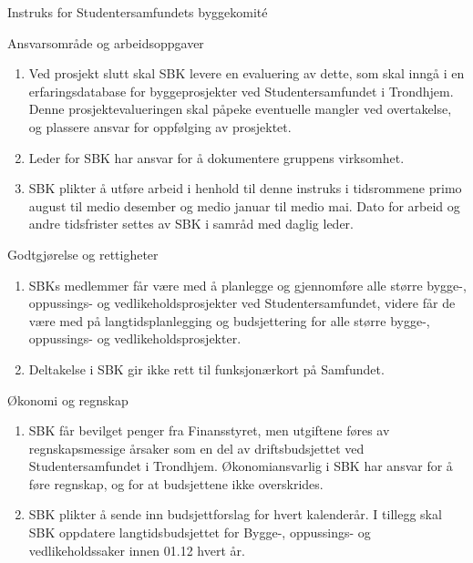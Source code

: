 \begin{instruks}{Instruks for Studentersamfundets byggekomité}{}{}
\begin{instruksledd}{ Ansvarsområde og arbeidsoppgaver}
\begin{enumerate}
                tilgjengelig hos daglig leder.
            \item Ved prosjekt slutt skal SBK levere en evaluering av dette, som skal inngå
                i en erfaringsdatabase for
                byggeprosjekter ved Studentersamfundet i Trondhjem. Denne
                prosjektevalueringen skal påpeke eventuelle
                mangler ved overtakelse, og plassere ansvar for oppfølging av prosjektet.
            \item
                Leder for SBK har ansvar for å dokumentere gruppens virksomhet.
            \item SBK plikter å utføre arbeid i henhold til denne instruks i tidsrommene
                primo august til medio desember og
                medio januar til medio mai. Dato for arbeid og andre tidsfrister settes av
                SBK i samråd med daglig leder.
        \end{enumerate}
    \end{instruksledd}

    \begin{instruksledd}{Godtgjørelse og rettigheter}
        \begin{enumerate}
            \item SBKs medlemmer får være med å planlegge og gjennomføre alle større bygge-,
                oppussings- og
                vedlikeholdsprosjekter ved Studentersamfundet, videre får de være med på
                langtidsplanlegging og
                budsjettering for alle større bygge-, oppussings- og vedlikeholdsprosjekter.
            \item Deltakelse i SBK gir ikke rett til funksjonærkort på Samfundet.
        \end{enumerate}
    \end{instruksledd}

    \begin{instruksledd}{Økonomi og regnskap}
        \begin{enumerate}
            \item SBK får bevilget penger fra Finansstyret, men utgiftene føres av
                regnskapsmessige årsaker som en del av
                driftsbudsjettet ved Studentersamfundet i Trondhjem. Økonomiansvarlig i SBK har
                ansvar for å føre
                regnskap, og for at budsjettene ikke overskrides.
            \item SBK plikter å sende inn budsjettforslag for hvert kalenderår. I tillegg skal
                SBK oppdatere langtidsbudsjettet
                for Bygge-, oppussings- og vedlikeholdssaker innen 01.12 hvert år.
        \end{enumerate}
    \end{instruksledd}


\end{instruks}
